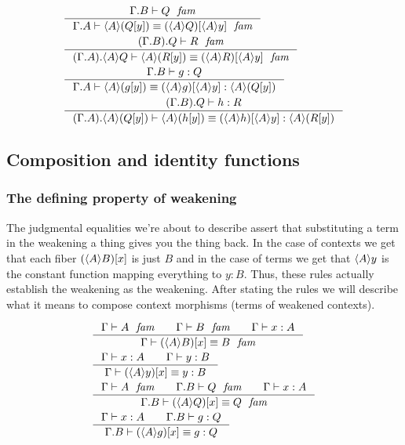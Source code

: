 \begin{align}
& \inference{\jfam{\ctxext{\Gamma}{B}}{Q}}{\jfameq{\ctxext{\Gamma}{A}}{\ctxwk{A}{\subst{y}{Q}}}{\subst{\ctxwk{A}{y}}{\ctxwk{A}{Q}}}}\\
& \inference{\jfam{\ctxext{{\Gamma}{B}}{Q}}{R}}{\jfameq{\ctxext{{\Gamma}{A}}{\ctxwk{A}{Q}}}{\ctxwk{A}{\subst{y}{R}}}{\subst{\ctxwk{A}{y}}{\ctxwk{A}{R}}}}\\
& \inference{\jterm{\ctxext{\Gamma}{B}}{Q}{g}}{\jtermeq{\ctxext{\Gamma}{A}}{\ctxwk{A}{\subst{y}{Q}}}{\ctxwk{A}{\subst{y}{g}}}{\subst{\ctxwk{A}{y}}{\ctxwk{A}{g}}}}\\
& \inference{\jterm{\ctxext{{\Gamma}{B}}{Q}}{R}{h}}{\jtermeq{\ctxext{{\Gamma}{A}}{\ctxwk{A}{\subst{y}{Q}}}}{\ctxwk{A}{\subst{y}{R}}}{\ctxwk{A}{\subst{y}{h}}}{\subst{\ctxwk{A}{y}}{\ctxwk{A}{h}}}}
\end{align}

\subsection{Composition and identity functions}
\subsubsection{The defining property of weakening}
The judgmental equalities we're about to describe assert that substituting a term
in the weakening a thing gives you the thing back. In the case of contexts we get that each fiber
$\subst{x}{\ctxwk{A}{B}}$ is just $B$ and in the case of terms we get 
that $\ctxwk{A}{y}$ is the constant function
mapping everything to $y:B$. Thus, these rules actually establish the weakening
as the weakening. After stating the rules we will describe what it means to
compose context morphisms (terms of weakened contexts).

\begin{align}
& \inference{\jfam{\Gamma}{A}\qquad\jfam{\Gamma}{B}\qquad\jterm{\Gamma}{A}{x}}{\jfameq{\Gamma}{\subst{x}{\ctxwk{A}{B}}}{B}}\label{defn-ws-1}\\
& \inference{\jterm{\Gamma}{A}{x}\qquad\jterm{\Gamma}{B}{y}}{\jtermeq{\Gamma}{B}{\subst{x}{\ctxwk{A}{y}}}{y}}\label{defn-ws-2}\\
& \inference{\jfam{\Gamma}{A}\qquad\jfam{\ctxext{\Gamma}{B}}{Q}\qquad\jterm{\Gamma}{A}{x}}{\jfameq{\ctxext{\Gamma}{B}}{\subst{x}{\ctxwk{A}{Q}}}{Q}}\label{defn-ws-3}\\
& \inference{\jterm{\Gamma}{A}{x}\qquad\jterm{\ctxext{\Gamma}{B}}{Q}{g}}{\jtermeq{\ctxext{\Gamma}{B}}{Q}{\subst{x}{\ctxwk{A}{g}}}{g}}\label{defn-ws-4}
\end{align}

